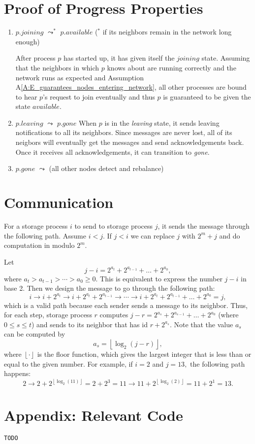 \documentclass[11pt]{article}
\begin{document}
\section{Proof of Progress Properties}
\begin{enumerate}[PG1]
\item
$p.joining$ $\leadsto^*$ $p.available$ ($^*$ if its neighbors remain in the network long enough) 

\indent After process $p$ has started up, it has given itself the $joining$ state. Assuming that the neighbors in which $p$ knows about are running correctly and the network runs as expected and Assumption A\ref{A:E_guarantees_nodes_entering_network}, all other processes are bound to hear $p$'s request to join eventually and thus $p$ is guaranteed to be given the state $available$.

\item 
$p.leaving$ $\leadsto$ $p.gone$
When $p$ is in the \emph{leaving} state, it sends leaving notifications to all its neighbors. Since messages are never lost, all of its neigbors will eventually get the messages and send acknowledgements back. Once it receives all acknowledgements, it can transition to \emph{gone}.

\item 
$p.gone$ $\leadsto$ (all other nodes detect and rebalance)

\end{enumerate}
\section{Communication}
For a storage process $i$ to send to storage process $j$, it sends 
the message through the following path. Assume $i < j$. If $j < i$ we can replace $j$ with $2^m + j$ and do computation in modulo $2^m.$

Let
\[
    j - i = 2^{a_t} + 2^{a_{t - 1}} + \ldots + 2^{a_0},
\]
where $a_t > a_{t - 1} > \cdots > a_0 \geq 0.$ This is equivalent to express the number $j - i$ in base 2. Then we design the message to go through the following path:
\[
    i \longrightarrow i + 2^{a_t} \longrightarrow i + 2^{a_t} + 2^{a_{t - 1}} \longrightarrow \cdots \longrightarrow 
    i + 2^{a_t} + 2^{a_{t - 1}} + \ldots + 2^{a_0} = j,
\]
which is a valid path because each sender sends a message to its neighbor. Thus, for each step, storage process $r$ computes $j - r = 2^{a_s} + 2^{a_{s-1}} + \ldots + 2^{a_0}$ (where $0\leq s \leq t$) and sends to its neighbor that has id $r + 2^{a_s}$. Note that the value $a_s$ can be computed by
\[
    a_s = \left\lfloor \log_2(j - r) \right\rfloor,
\]
where $\left\lfloor \cdot \right\rfloor$ is the floor function, which gives the largest integer that is less than or equal to the given number. For example, if $i = 2$ and $j = 13,$ the following path happens:
\[
    2 \longrightarrow 2 + 2^{\left\lfloor \log_2(11) \right\rfloor} = 2 + 2^3 = 11  \longrightarrow 11 + 2^{\left\lfloor \log_2(2) \right\rfloor} = 11 + 2^1 = 13.
\]

\section{Appendix: Relevant Code}
\begin{lstlisting}
TODO
\end{lstlisting}
\end{document}
